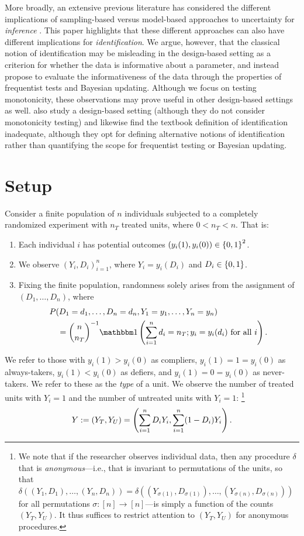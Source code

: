 \documentclass[12pt,reqno]{amsart}
\begin{document}
More broadly, an extensive previous literature has considered the different implications
of sampling-based versus model-based approaches to uncertainty for \emph{inference}
\citep[e.g.][]{li_general_2017,abadie_sampling-based_2020}. This paper highlights that
these different approaches can also have different implications for \emph{identification}.
We argue, however, that the classical notion of identification may be misleading in the
design-based setting as a criterion for whether the data is informative about a parameter,
and instead propose to evaluate the informativeness of the data through the properties of
frequentist tests and Bayesian updating. Although we focus on testing monotonicity, these
observations may prove useful in other design-based settings as well. \citet{kline2025finite} also study a design-based setting (although they do not consider monotonicity testing) and likewise find the textbook definition of identification inadequate, although they opt for defining alternative notions of identification rather than quantifying the scope for frequentist testing or Bayesian updating.

\section{Setup}
\label{sec:setup}
Consider a finite population of $n$ individuals subjected to a completely randomized
experiment with $n_T$ treated units, where $0 < n_T < n$. That is:
\begin{enumerate}
    \item Each individual $i$ has
potential outcomes $(y_i(1), y_i(0)) \in \left\{{0,1}\right\}^2$.
\item We observe $(Y_i, D_i)_
{i=1}^n$, where $Y_i = y_i(D_i)$ and $D_i \in \left\{{0,1}\right\}$.
\item Fixing the finite
population, randomness solely arises from
the assignment of $(D_1,\ldots, D_n)$, where \begin{align*}
&P(D_1=d_1,\ldots, D_n=d_n, Y_1=y_1,\ldots, Y_n = y_n) \\&\quad= \binom{n}{n_T}^{-1} \one
\pr{\sum_
{i=1}^n d_i = n_T; y_i = y_i(d_i) \text{ for all $i$}}.
\end{align*}
\end{enumerate}
We refer to those with $y_i(1) > y_i(0)$ as compliers, $y_i(1) =  1 = y_i(0)$ as always-takers, $y_i(1) < y_i(0)$ as defiers, and $y_i(1) = 0 = y_i(0)$ as
 never-takers.
 We refer to these as the \emph{type} of a unit. We observe the number of treated units with $Y_i=1$ and the number of
untreated units with $Y_i=1$:%
\footnote{We note that if the researcher observes individual data, then any procedure $\delta$ that is \emph{anonymous}---i.e., that is invariant to permutations of the units, so that $\delta((Y_1,D_1),\ldots, (Y_n, D_n)) = \delta((Y_{\sigma(1)}, D_{\sigma(1)}),
\ldots, (Y_{\sigma(n)}, D_{\sigma(n)}))$ for all permutations $\sigma: [n] \to [n]$---is simply a function of the counts $(Y_T,Y_U)$. It thus suffices to restrict attention to $(Y_T,Y_U)$ for anonymous procedures.}
\[
Y := (Y_T, Y_U) = \left(\sum_{i=1}^n D_i Y_i, \sum_{i=1}^n (1-D_i) Y_i\right). 
\]
 
\end{document}
